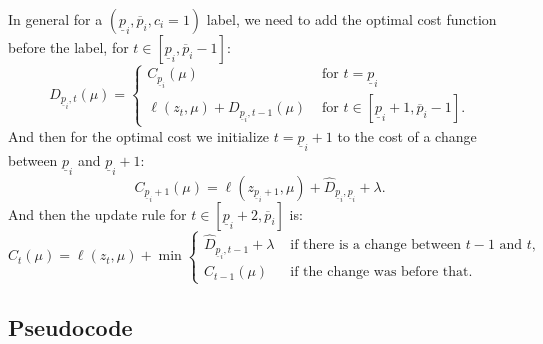 \documentclass{article}
\begin{document}
In general for a $(\underline p_i,\overline p_i,c_i=1)$ label, we need
to add the optimal cost function before the label, for
$t\in[\underline p_i, \overline p_i-1]$:
\begin{equation}
D_{\underline p_i, t}(\mu) = 
\begin{cases}
  C_{\underline p_i}(\mu) & \text{ for }t=\underline p_i\\
  \ell(z_t, \mu) + D_{\underline p_i,t-1}(\mu) & \text{ for }t\in[\underline p_i+1, \overline p_i-1].
\end{cases}
\end{equation}
And then for the optimal cost we initialize $t=\underline p_i+1$ to
the cost of a change between $\underline p_i$ and $\underline p_i+1$:
\begin{equation}
  C_{\underline p_i+1}(\mu)=\ell(z_{\underline p_i+1},\mu)+\hat D_{\underline p_i,\underline p_i}+\lambda.
\end{equation}
And then
the update rule for
$t\in[\underline p_i+2, \overline p_i]$ is:
\begin{equation}
  \label{eq:positive_update}
  C_t(\mu)=\ell(z_t, \mu) + \min
  \begin{cases}
\hat D_{\underline p_i, t-1}+\lambda &\text{ if there is a change between $t-1$ and $t$,}\\
C_{t-1}(\mu) & \text{ if the change was before that.}
  \end{cases}
\end{equation}

\subsection{Pseudocode}
\end{document}
